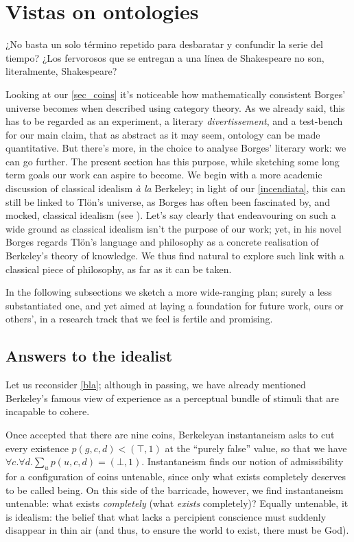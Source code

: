 \section{Vistas on ontologies}\label{vistas}
\epigraph{¿No basta un solo término repetido para desbaratar y confundir la serie del tiempo? ¿Los fervorosos que se entregan a una línea de Shakespeare no son, literalmente, Shakespeare?}{\cite{confutacion}}
Looking at our \autoref{sec_coins} it's noticeable how mathematically consistent Borges' universe becomes when described using category theory. As we already said, this has to be regarded as an experiment, a literary \emph{divertissement}, and a test-bench for our main claim, that as abstract as it may seem, ontology can be made quantitative. But there's more, in the choice to analyse Borges' literary work: we can go further. The present section has this purpose, while sketching some long term goals our work can aspire to become. We begin with a more academic discussion of classical idealism \emph{à la} Berkeley; in light of our \autoref{incendiata}, this can still be linked to Tl\"on's universe, as Borges has often been fascinated by, and mocked, classical idealism (see \cite{confutacion}). Let's say clearly that endeavouring on such a wide ground as classical idealism isn't the purpose of our work; yet, in his novel Borges regards Tl\"on's language and philosophy as a concrete realisation of Berkeley's theory of knowledge. We thus find natural to explore such link with a classical piece of philosophy, as far as it can be taken.

In the following subsections we sketch a more wide-ranging plan; surely a less substantiated one, and yet aimed at laying a foundation for future work, ours or others', in a research track that we feel is fertile and promising.
\subsection{Answers to the idealist}\label{berkelei}
Let us reconsider \autoref{bla}; although in passing, we have already mentioned Berkeley's famous view of experience as a perceptual bundle of stimuli that are incapable to cohere. 

Once accepted that there are nine coins, Berkeleyan instantaneism asks to cut every existence $p(g,c,d) < (\top,1)$ at the ``purely false'' value, so that we have $\forall c.\forall d.\sum_u p(u,c,d) = (\bot,1)$. Instantaneism finds our notion of admissibility for a configuration of coins untenable, since only what exists completely deserves to be called being. On this side of the barricade, however, we find instantaneism untenable: what exists \emph{completely} (what \emph{exists} completely)? Equally untenable, it is idealism: the belief that what lacks a percipient conscience must suddenly disappear in thin air (and thus, to ensure the world to exist, there must be God).

